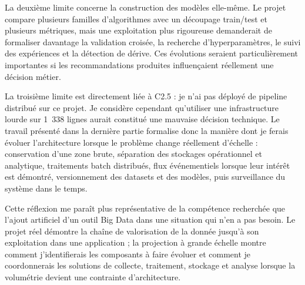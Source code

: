 La deuxième limite concerne la construction des modèles elle-même. Le projet compare plusieurs familles d'algorithmes avec un découpage train/test et plusieurs métriques, mais une exploitation plus rigoureuse demanderait de formaliser davantage la validation croisée, la recherche d'hyperparamètres, le suivi des expériences et la détection de dérive. Ces évolutions seraient particulièrement importantes si les recommandations produites influençaient réellement une décision métier.

La troisième limite est directement liée à C2.5 : je n'ai pas déployé de pipeline distribué sur ce projet. Je considère cependant qu'utiliser une infrastructure lourde sur 1~338 lignes aurait constitué une mauvaise décision technique. Le travail présenté dans la dernière partie formalise donc la manière dont je ferais évoluer l'architecture lorsque le problème change réellement d'échelle : conservation d'une zone brute, séparation des stockages opérationnel et analytique, traitements batch distribués, flux événementiels lorsque leur intérêt est démontré, versionnement des datasets et des modèles, puis surveillance du système dans le temps.

Cette réflexion me paraît plus représentative de la compétence recherchée que l'ajout artificiel d'un outil Big Data dans une situation qui n'en a pas besoin. Le projet réel démontre la chaîne de valorisation de la donnée jusqu'à son exploitation dans une application ; la projection à grande échelle montre comment j'identifierais les composants à faire évoluer et comment je coordonnerais les solutions de collecte, traitement, stockage et analyse lorsque la volumétrie devient une contrainte d'architecture.
